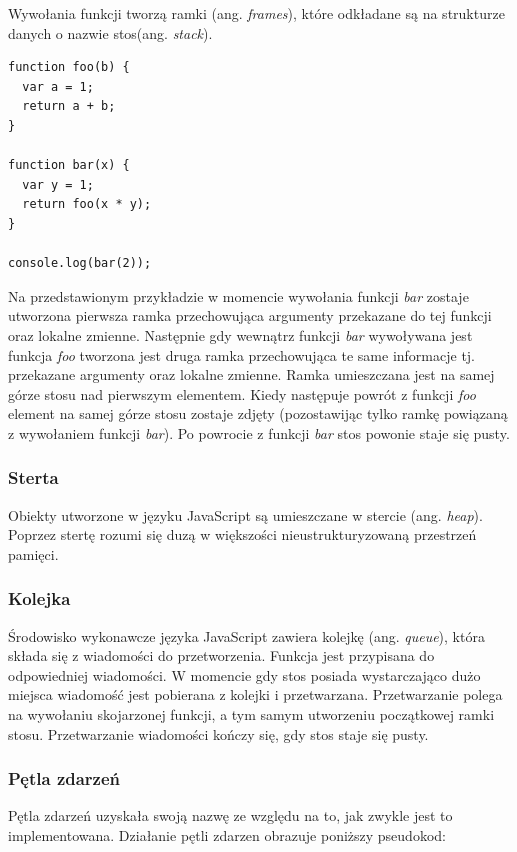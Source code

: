 \documentclass[polish, twoside, 12pt]{mwart}
\begin{document}
Wywołania funkcji tworzą ramki (ang. \emph{frames}), które odkładane są na strukturze danych o nazwie stos(ang. \emph{stack}).

\begin{lstlisting}
function foo(b) {
  var a = 1;
  return a + b;
}

function bar(x) {
  var y = 1;
  return foo(x * y);
}

console.log(bar(2));
\end{lstlisting}

Na przedstawionym przykładzie w momencie wywołania funkcji \emph{bar} zostaje utworzona pierwsza ramka przechowująca argumenty przekazane do tej funkcji oraz lokalne zmienne. Następnie gdy wewnątrz funkcji \emph{bar} wywoływana jest funkcja \emph{foo} tworzona jest druga ramka przechowująca te same informacje tj. przekazane argumenty oraz lokalne zmienne. Ramka umieszczana jest na samej górze stosu nad pierwszym elementem. Kiedy następuje powrót z funkcji \emph{foo} element na samej górze stosu zostaje zdjęty (pozostawijąc tylko ramkę powiązaną z wywołaniem funkcji \emph{bar}). Po powrocie z funkcji \emph{bar} stos powonie staje się pusty.

\subsubsection{Sterta}

Obiekty utworzone w języku JavaScript są umieszczane w stercie (ang. \emph{heap}). Poprzez stertę rozumi się duzą w większości nieustrukturyzowaną przestrzeń pamięci.

\subsubsection{Kolejka}

Środowisko wykonawcze języka JavaScript zawiera kolejkę (ang. \emph{queue}), która składa się z wiadomości do przetworzenia. Funkcja jest przypisana do odpowiedniej wiadomości. W momencie gdy stos posiada wystarczająco dużo miejsca wiadomość jest pobierana z kolejki i przetwarzana. Przetwarzanie polega na wywołaniu skojarzonej funkcji, a tym samym utworzeniu początkowej ramki stosu.
Przetwarzanie wiadomości kończy się, gdy stos staje się pusty.

\subsubsection{Pętla zdarzeń}

Pętla zdarzeń uzyskała swoją nazwę ze względu na to, jak zwykle jest to implementowana. Działanie pętli zdarzen obrazuje poniższy pseudokod:
\end{document}
